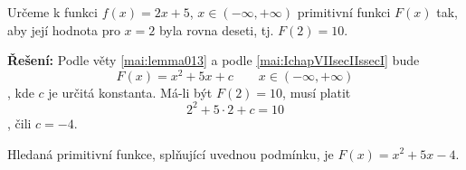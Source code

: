 \begin{mdframed}[style=mdexam]
  \begin{example}\label{MAI:exam143}
    Určeme k funkci \(f(x)=2x+5\), \(x\in(-\infty, +\infty)\) primitivní funkci \(F(x)\) tak, aby
    její hodnota pro \(x=2\) byla rovna deseti, tj. \(F(2)=10\).  

    \noindent\textbf{Řešení:}
    Podle věty \eqref{mai:lemma013} a podle \eqref{mai:IchapVIIsecIIssecI} bude \[F(x)=x^2 + 5x +
    c\qquad x\in(-\infty, +\infty)\], kde \(c\) je určitá konstanta. Má-li být \(F(2) = 10\), musí
    platit \[2^2+5\cdot2 + c = 10\], čili \(c=-4\). 

    Hledaná primitivní funkce, splňující uvednou podmínku, je \(F(x)=x^2 + 5x -4\).
  \end{example}
\end{mdframed}